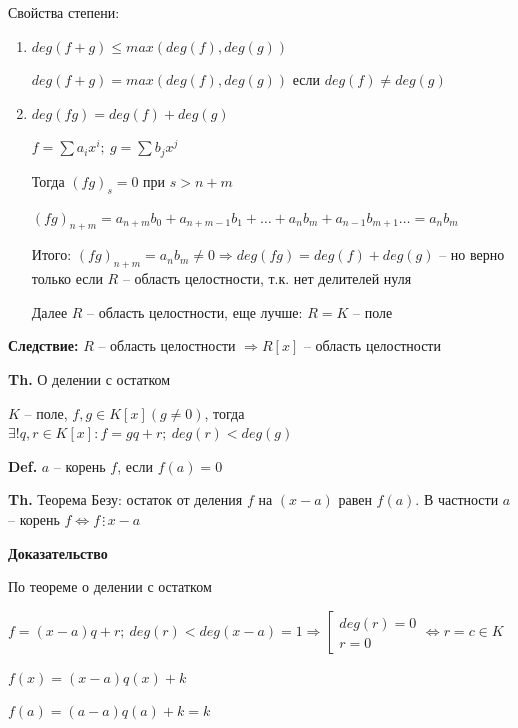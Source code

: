\documentclass[14pt, letter paper]{article}
\begin{document}
\vspace{5mm}

Свойства степени:

\begin{enumerate}
    \item $deg(f + g) \leq max(deg(f), deg(g))$

    $deg(f + g) = max(deg(f), deg(g))$ если $deg(f) \neq deg(g)$

    \item $deg(fg) = deg(f) + deg(g)$

    $f = \sum a_ix^i;\ g = \sum b_jx^j$

    Тогда $(fg)_s = 0$ при $s > n + m$

    $(fg)_{n+m} = a_{n+m}b_0 + a_{n+m-1}b_1 + \ldots + a_nb_m + a_{n-1}b_{m+1} \ldots = a_nb_m$

    Итого: $(fg)_{n+m} = a_nb_m \neq 0 \Rightarrow deg(fg) = deg(f) + deg(g)$ -- но верно только если $R$ -- область целостности, т.к. нет делителей нуля

    Далее $R$ -- область целостности, еще лучше: $R = K$ -- поле
\end{enumerate}

\textbf{Следствие:} $R$ -- область целостности $\Rightarrow R[x]$ -- область целостности 

\vspace{5mm}

\textbf{Th.} О делении с остатком

$K$ -- поле, $f, g \in K[x] (g \neq 0)$, тогда $\exists! q, r \in K[x] : f = gq + r;\ deg(r) < deg(g)$

\textbf{Def.} $a$ -- корень $f$, если $f(a) = 0$

\textbf{Th.} Теорема Безу: остаток от деления $f$ на $(x - a)$ равен $f(a)$. В частности $a$ -- корень $f \Leftrightarrow f \, \vdots \, x - a$

\begin{center}
    \textbf{Доказательство}
\end{center}

По теореме о делении с остатком

$f = (x-a)q + r;\ deg(r) < deg(x-a) = 1 \Rightarrow \left[ \begin{gathered}
    deg(r) = 0 \\
    r = 0
\end{gathered} \right. \Leftrightarrow r = c \in K$

$f(x) = (x - a) q(x) + k$

$f(a) = (a - a) q(a) + k = k$
\end{document}
